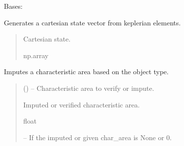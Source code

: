 \documentclass[letterpaper,10pt,english]{sphinxmanual}
\begin{document}
\begin{fulllineitems}
\pysigstopsignatures
\sphinxAtStartPar
Bases: 

\begin{fulllineitems}
\label{\detokenize{fspsim.utils:fspsim.utils.SpaceObject.SpaceObject.generate_cart}}
\pysigstartsignatures
{}
\pysigstopsignatures
\sphinxAtStartPar
Generates a cartesian state vector from keplerian elements.
\begin{quote}\begin{description}
\sphinxAtStartPar
Cartesian state.

\sphinxAtStartPar
np.array

\end{description}\end{quote}

\end{fulllineitems}


\begin{fulllineitems}
\label{\detokenize{fspsim.utils:fspsim.utils.SpaceObject.SpaceObject.impute_char_area}}
\pysigstartsignatures
{}
\pysigstopsignatures
\sphinxAtStartPar
Imputes a characteristic area based on the object type.
\begin{quote}\begin{description}
\sphinxAtStartPar
{} () – Characteristic area to verify or impute.

\sphinxAtStartPar
Imputed or verified characteristic area.

\sphinxAtStartPar
float

\sphinxAtStartPar
{} – If the imputed or given char\_area is None or 0.


\end{description}
\end{quote}
\end{fulllineitems}
\end{fulllineitems}
\end{document}
